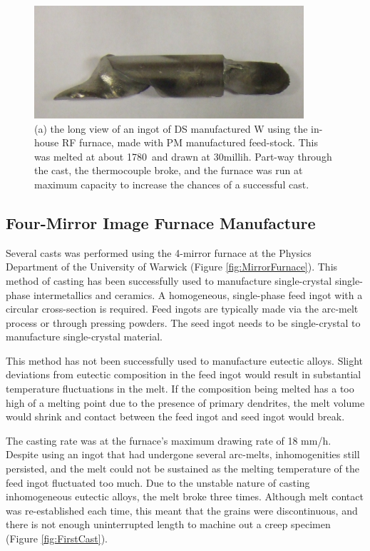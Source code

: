 %
\begin{figure}[H]
\begin{center}
\includegraphics[width=10cm]{sanw}
\caption{(a) the long view of an ingot of DS manufactured W using the in-house RF furnace, made with PM manufactured feed-stock. This was melted at about 1780\celsius\ and drawn at 30milli\metre\/h. Part-way through the cast, the thermocouple broke, and the furnace was run at maximum capacity to increase the chances of a successful cast.}
\label{fig:sanw}
\end{center}
\end{figure}
%


\clearpage
\subsection{Four-Mirror Image Furnace Manufacture}

Several casts was performed using the 4-mirror furnace at the Physics Department of the University of Warwick (Figure \ref{fig:MirrorFurnace}).  This method of casting has been successfully used to manufacture single-crystal single-phase intermetallics and ceramics.  A homogeneous, single-phase feed ingot with a circular cross-section is required.  Feed ingots are typically made via the arc-melt process or through pressing powders.  The seed ingot needs to be single-crystal to manufacture single-crystal material.  

This method has not been successfully used to manufacture eutectic alloys.  Slight deviations from eutectic composition in the feed ingot would result in substantial temperature fluctuations in the melt.  If the composition being melted has a too high of a melting point due to the presence of primary dendrites, the melt volume would shrink and contact between the feed ingot and seed ingot would break. 
 

The casting rate was at the furnace's maximum drawing rate of 18 mm/h.  Despite using an ingot that had undergone several arc-melts, inhomogenities still persisted, and the melt could not be sustained as the melting temperature of the feed ingot fluctuated too much.  Due to the unstable nature of casting inhomogeneous eutectic alloys, the melt broke three times.  Although melt contact was re-established each time, this meant that the grains were discontinuous, and there is not enough uninterrupted length to machine out a creep specimen (Figure \ref{fig:FirstCast}).

